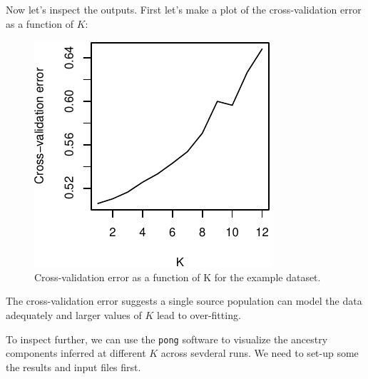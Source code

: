 \documentclass[smallextended]{svjour3}       %
\newenvironment{Shaded}{\begin{snugshade}}{\end{snugshade}}
\newcommand{\KeywordTok}[1]{\textcolor[rgb]{0.13,0.29,0.53}{\textbf{#1}}}
\newcommand{\DataTypeTok}[1]{\textcolor[rgb]{0.13,0.29,0.53}{#1}}
\newcommand{\DecValTok}[1]{\textcolor[rgb]{0.00,0.00,0.81}{#1}}
\newcommand{\FloatTok}[1]{\textcolor[rgb]{0.00,0.00,0.81}{#1}}
\newcommand{\StringTok}[1]{\textcolor[rgb]{0.31,0.60,0.02}{#1}}
\newcommand{\OperatorTok}[1]{\textcolor[rgb]{0.81,0.36,0.00}{\textbf{#1}}}
\newcommand{\NormalTok}[1]{#1}
\begin{document}
Now let's inspect the outputs. First let's make a plot of the
cross-validation error as a function of \(K\):

\begin{Shaded}
\end{Shaded}

\begin{figure}
\centering
\includegraphics{plot/unnamed-chunk-13-1.pdf}
\caption{Cross-validation error as a function of K for the example
dataset.}
\end{figure}

The cross-validation error suggests a single source population can model
the data adequately and larger values of \(K\) lead to over-fitting.

To inspect further, we can use the \texttt{pong} software to visualize
the ancestry components inferred at different \(K\) across sevderal
runs. We need to set-up some the results and input files first.
\end{document}
